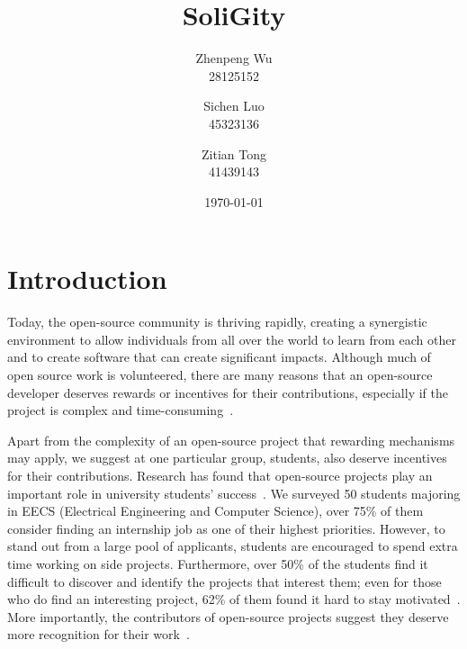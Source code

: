 \documentclass[12pt]{article}
\title{SoliGity}
\author{  
  Zhenpeng Wu\\
  28125152 
  \and
  Sichen Luo\\
  45323136
  \and
  Zitian Tong\\
  41439143
}
\date{\today}
\renewcommand{\_}{\kern-1.5pt\textunderscore\kern-1.5pt}
\begin{document}
\maketitle

\section{Introduction}

Today, the open-source community is thriving rapidly, creating a synergistic environment to allow individuals
from all over the world to learn from each other and to create software that can create significant impacts.
Although much of open source work is volunteered, there are many reasons that an open-source developer deserves
rewards or incentives for their contributions, especially if the project is complex and time-consuming~\cite{community_collaboration}.

Apart from the complexity of an open-source project that rewarding mechanisms may apply, we suggest at one
particular group, students, also deserve incentives for their contributions. Research has found that open-source
projects play an important role in university students’ success~\cite{open_source_guides}. We surveyed 50
students majoring in EECS (Electrical Engineering and Computer Science), over 75\% of them consider finding
an internship job as one of their highest priorities. However, to stand out from a large pool of applicants, students are encouraged to spend extra time working on side projects. Furthermore, over 50\% of the students find it difficult to discover
and identify the projects that interest them; even for those who do find an interesting project, 62\% of them
found it hard to stay motivated~\cite{thomas_toch_2014}. More importantly, the contributors of open-source
projects suggest they deserve more recognition for their work~\cite{freecodecamp.org_2018}.
\end{document}
